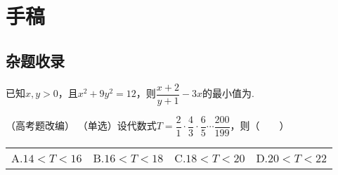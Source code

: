 \chapter{手稿}
\section{杂题收录}
\begin{example}{}{}
    已知$x,y>0$，且$x^2+9y^2=12$，则$\dfrac{x+2}{y+1}-3x$的最小值为\underline{\hspace{2cm}}.
\end{example}
\begin{solution}

\end{solution}
\newpage
\begin{example}{（高考题改编）}{}
    （单选）设代数式$\displaystyle T = \dfrac21\cdot\dfrac{4}{3}\cdot\dfrac{6}{5}\cdots\dfrac{200}{199}$，则（~~~~）

    \begin{tabular}{@{}llll@{}}
        A.$14< T < 16$&B.$16 < T < 18$&C.$18< T < 20$&D.$20< T < 22$
    \end{tabular}
\end{example}
